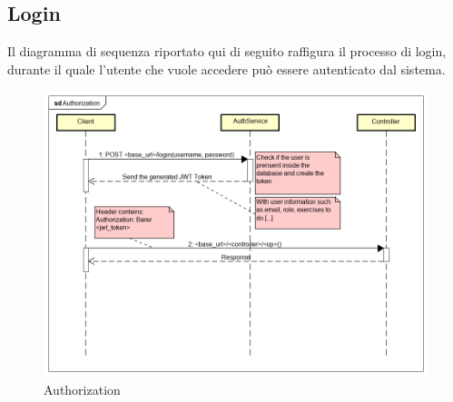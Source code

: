 \subsection{Login}
Il diagramma di sequenza riportato qui di seguito raffigura il processo di login, durante il quale l'utente che vuole accedere può essere autenticato dal sistema.
\begin{figure}[H]
\centering
\includegraphics[width=17cm, keepaspectratio]{img/Authorization.png} 
\caption{Authorization}
\end{figure}

